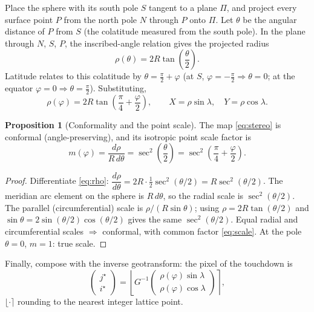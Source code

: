 \documentclass[11pt]{article}
\theoremstyle{definition}
\newtheorem{proposition}{Proposition}[section]
\newcommand{\half}{\tfrac{1}{2}}
\begin{document}
Place the sphere with its south pole $S$ tangent to a plane $\Pi$, and project every
surface point $P$ from the north pole $N$ through $P$ onto $\Pi$. Let $\theta$ be the
angular distance of $P$ from $S$ (the colatitude measured from the south pole). In
the plane through $N$, $S$, $P$, the inscribed-angle relation gives the projected
radius
\begin{equation}
\rho(\theta) = 2R\tan\!\left(\frac{\theta}{2}\right).
\label{eq:rho}
\end{equation}
Latitude relates to this colatitude by $\theta = \tfrac{\pi}{2}+\varphi$ (at $S$,
$\varphi=-\tfrac{\pi}{2}\Rightarrow\theta=0$; at the equator $\varphi=0\Rightarrow
\theta=\tfrac{\pi}{2}$). Substituting,
\begin{equation}
\boxed{\;\rho(\varphi) = 2R\tan\!\left(\frac{\pi}{4}+\frac{\varphi}{2}\right),\qquad
X = \rho\sin\lambda,\quad Y=\rho\cos\lambda.\;}
\label{eq:stereo}
\end{equation}

\begin{proposition}[Conformality and the point scale]
The map \eqref{eq:stereo} is conformal (angle-preserving), and its isotropic point
scale factor is
\begin{equation}
m(\varphi)=\frac{d\rho}{R\,d\theta}=\sec^2\!\left(\frac{\theta}{2}\right)
=\sec^2\!\left(\frac{\pi}{4}+\frac{\varphi}{2}\right).
\label{eq:scale}
\end{equation}
\end{proposition}
\begin{proof}
Differentiate \eqref{eq:rho}: $\dfrac{d\rho}{d\theta}=2R\cdot\half\sec^2(\theta/2)
=R\sec^2(\theta/2)$. The meridian arc element on the sphere is $R\,d\theta$, so the
radial scale is $\sec^2(\theta/2)$. The parallel (circumferential) scale is
$\rho/(R\sin\theta)$; using $\rho=2R\tan(\theta/2)$ and
$\sin\theta=2\sin(\theta/2)\cos(\theta/2)$ gives the same $\sec^2(\theta/2)$. Equal
radial and circumferential scales $\Rightarrow$ conformal, with common factor
\eqref{eq:scale}. At the pole $\theta=0$, $m=1$: true scale.
\end{proof}

Finally, compose with the inverse geotransform: the pixel of the touchdown is
\begin{equation}
\begin{pmatrix}j^\star\\ i^\star\end{pmatrix}
=\left\lfloor G^{-1}\!\begin{pmatrix}\rho(\varphi)\sin\lambda\\ \rho(\varphi)\cos\lambda\end{pmatrix}\right\rceil ,
\label{eq:tdpixel}
\end{equation}
$\lfloor\cdot\rceil$ rounding to the nearest integer lattice point.
\end{document}
